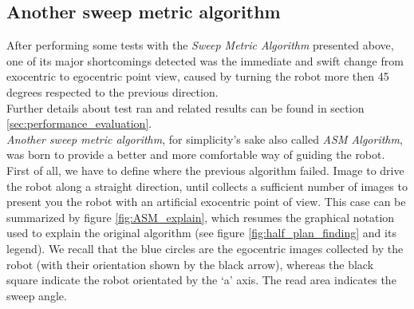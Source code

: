 \subsection{Another sweep metric algorithm}
\label{concr:iimageselector:another_sweep_metric_algorithm}

After performing some tests with the \textit{Sweep Metric
Algorithm} presented above, one of its major shortcomings
detected was the immediate and swift change from exocentric
to egocentric point view, caused by turning the robot
more then 45 degrees respected to the previous direction.
\\
Further details about test ran and related results can be
found in section \ref{sec:performance_evaluation}.
\\
\textit{Another sweep metric algorithm}, for simplicity's
sake also called \textit{ASM Algorithm}, was born to provide
a better and more comfortable way of guiding the robot.
\\
First of all, we have to define where the previous algorithm
failed. Image to drive the robot along a straight direction,
until \framework{} collects a sufficient number of images to
present you the robot with an artificial exocentric point of
view. This case can be summarized by figure \ref{fig:ASM_explain},
which resumes the graphical notation
used to explain the original algorithm (see figure
\ref{fig:half_plan_finding} and its legend). We recall
that the blue circles are the egocentric images collected
by the robot (with their orientation shown by the black
arrow), whereas the black square indicate the robot orientated
by the `a' axis. The read area indicates the sweep angle.

